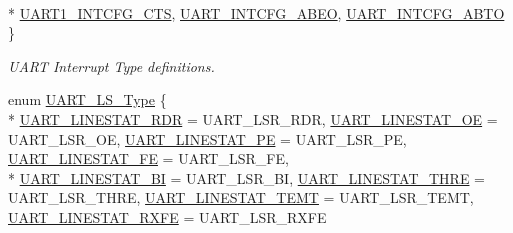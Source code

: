 \begin{DoxyCompactItemize}
\\*
\hyperlink{group___u_a_r_t___public___types_gga7ee4c5ddc0e165158d0d9f1f03e1b66ca9ea853ac0b6dece30a9d7aa2a0ca1110}{U\+A\+R\+T1\+\_\+\+I\+N\+T\+C\+F\+G\+\_\+\+C\+TS}, 
\hyperlink{group___u_a_r_t___public___types_gga7ee4c5ddc0e165158d0d9f1f03e1b66cac0a7b0a2b1bf47b4ea548a1a6a53e174}{U\+A\+R\+T\+\_\+\+I\+N\+T\+C\+F\+G\+\_\+\+A\+B\+EO}, 
\hyperlink{group___u_a_r_t___public___types_gga7ee4c5ddc0e165158d0d9f1f03e1b66ca773e56dd8db09799644143cf91cda057}{U\+A\+R\+T\+\_\+\+I\+N\+T\+C\+F\+G\+\_\+\+A\+B\+TO}
 \}\begin{DoxyCompactList}\small\item\em U\+A\+RT Interrupt Type definitions. \end{DoxyCompactList}
\item 
enum \hyperlink{group___u_a_r_t___public___types_ga3b9d0e882746f0275d78131ebd218ff5}{U\+A\+R\+T\+\_\+\+L\+S\+\_\+\+Type} \{ \\*
\hyperlink{group___u_a_r_t___public___types_gga3b9d0e882746f0275d78131ebd218ff5ab947186ba7d7733449ceb1bf2a058c5d}{U\+A\+R\+T\+\_\+\+L\+I\+N\+E\+S\+T\+A\+T\+\_\+\+R\+DR} = U\+A\+R\+T\+\_\+\+L\+S\+R\+\_\+\+R\+DR, 
\hyperlink{group___u_a_r_t___public___types_gga3b9d0e882746f0275d78131ebd218ff5a08c4d17001d37d2ccb5190fa5b284547}{U\+A\+R\+T\+\_\+\+L\+I\+N\+E\+S\+T\+A\+T\+\_\+\+OE} = U\+A\+R\+T\+\_\+\+L\+S\+R\+\_\+\+OE, 
\hyperlink{group___u_a_r_t___public___types_gga3b9d0e882746f0275d78131ebd218ff5af1f0d15cc0e93f0d7576e6ef43e207a2}{U\+A\+R\+T\+\_\+\+L\+I\+N\+E\+S\+T\+A\+T\+\_\+\+PE} = U\+A\+R\+T\+\_\+\+L\+S\+R\+\_\+\+PE, 
\hyperlink{group___u_a_r_t___public___types_gga3b9d0e882746f0275d78131ebd218ff5a66c63ef21673ce11b705b563bc1e2045}{U\+A\+R\+T\+\_\+\+L\+I\+N\+E\+S\+T\+A\+T\+\_\+\+FE} = U\+A\+R\+T\+\_\+\+L\+S\+R\+\_\+\+FE, 
\\*
\hyperlink{group___u_a_r_t___public___types_gga3b9d0e882746f0275d78131ebd218ff5a11a3713f432041c0d0536fe494792cf1}{U\+A\+R\+T\+\_\+\+L\+I\+N\+E\+S\+T\+A\+T\+\_\+\+BI} = U\+A\+R\+T\+\_\+\+L\+S\+R\+\_\+\+BI, 
\hyperlink{group___u_a_r_t___public___types_gga3b9d0e882746f0275d78131ebd218ff5a872c97a0e539217a173e6fc22f80421d}{U\+A\+R\+T\+\_\+\+L\+I\+N\+E\+S\+T\+A\+T\+\_\+\+T\+H\+RE} = U\+A\+R\+T\+\_\+\+L\+S\+R\+\_\+\+T\+H\+RE, 
\hyperlink{group___u_a_r_t___public___types_gga3b9d0e882746f0275d78131ebd218ff5ad72f2a70b4f9352d478fdff4c7815867}{U\+A\+R\+T\+\_\+\+L\+I\+N\+E\+S\+T\+A\+T\+\_\+\+T\+E\+MT} = U\+A\+R\+T\+\_\+\+L\+S\+R\+\_\+\+T\+E\+MT, 
\hyperlink{group___u_a_r_t___public___types_gga3b9d0e882746f0275d78131ebd218ff5a145e4a60ee30310ef52400e0e2eefd88}{U\+A\+R\+T\+\_\+\+L\+I\+N\+E\+S\+T\+A\+T\+\_\+\+R\+X\+FE} = U\+A\+R\+T\+\_\+\+L\+S\+R\+\_\+\+R\+X\+FE

\end{DoxyCompactItemize}
